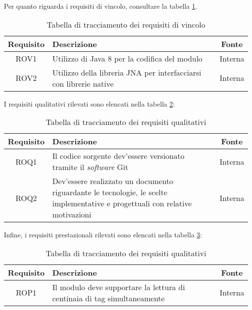 Per quanto riguarda i requisiti di vincolo, consultare la tabella \ref{tab:requisiti-vinc}.
\begin{table}[!htb]
    \begin{tabularx}{\textwidth}{ | c | X | c |}
    \hline
    \textbf{Requisito} & \textbf{Descrizione} & \textbf{Fonte}\\
    \hline
    ROV1 & Utilizzo di Java 8 per la codifica del modulo & Interna \\
    \hline
    ROV2 & Utilizzo della libreria JNA per interfacciarsi con librerie native & Interna \\
    \hline
    \end{tabularx}
    \caption{Tabella di tracciamento dei requisiti di vincolo}
    \label{tab:requisiti-vinc}
\end{table}
I requisiti qualitativi rilevati sono elencati nella tabella \ref{tab:requisiti-qual}:
\begin{table}[!htb]
    \begin{tabularx}{\textwidth}{ | c | X | c |}
    \hline
    \textbf{Requisito} & \textbf{Descrizione} & \textbf{Fonte}\\
    \hline
    ROQ1 & Il codice sorgente dev'essere versionato tramite il \emph{software} Git & Interna \\
    \hline
    ROQ2 & Dev'essere realizzato un documento riguardante le tecnologie, le scelte implementative e progettuali con relative motivazioni & Interna \\
    \hline
    \end{tabularx}
    \caption{Tabella di tracciamento dei requisiti qualitativi}
    \label{tab:requisiti-qual}
\end{table}
Infine, i requisiti prestazionali rilevati sono elencati nella tabella \ref{tab:requisiti-pre}:
\begin{table}[!htb]
    \begin{tabularx}{\textwidth}{ | c | X | c |}
    \hline
    \textbf{Requisito} & \textbf{Descrizione} & \textbf{Fonte}\\
    \hline
    ROP1 & Il modulo deve supportare la lettura di centinaia di tag simultaneamente & Interna \\
    \hline
    \end{tabularx}
    \caption{Tabella di tracciamento dei requisiti qualitativi}
    \label{tab:requisiti-pre}
\end{table}
